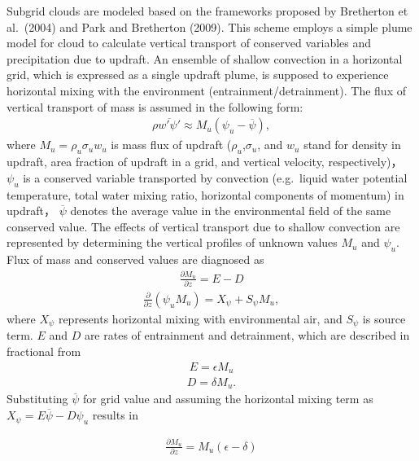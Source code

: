 Subgrid clouds are modeled based on the frameworks proposed by Bretherton et al.~(2004) and Park and Bretherton (2009). This scheme employs a simple plume model for cloud to calculate vertical
transport of conserved variables and precipitation due to updraft. An ensemble of shallow convection in a horizontal grid, which is expressed as a single updraft plume, is supposed to experience
horizontal mixing with the environment (entrainment/detrainment). The flux of vertical transport of mass is assumed in the following form: \begin{eqnarray} \label{def-Mu}
    \rho \overline {w' \psi '}\approx M_u (\psi_u-\overline{\psi}) ,\end{eqnarray} where \(M_u=\rho_u\sigma_u w_u\) is mass flux of updraft (\(\rho_u\),\(\sigma_u\), and \(w_u\) stand for density in updraft, area
fraction of updraft in a grid, and vertical velocity, respectively)， \(\psi_u\) is a conserved variable transported by convection (e.g.~liquid water potential temperature, total water mixing ratio,
horizontal components of momentum) in updraft， \(\overline{\psi}\) denotes the average value in the environmental field of the same conserved value. The effects of vertical transport due to shallow
convection are represented by determining the vertical profiles of unknown values \(M_u\) and \(\psi_u\). Flux of mass and conserved values are diagnosed as \begin{eqnarray}
    \frac{\partial M_u}{\partial z} = E - D \label{zprof-Mu}
\end{eqnarray} \begin{eqnarray}
    \frac{\partial}{\partial z} (\psi_u M_u) = X_\psi + S_\psi M_u,\label{zprof-psi} \end{eqnarray} where \(X_\psi\) represents horizontal mixing with environmental air, and \(S_\psi\) is source term. \(E\) and
\(D\) are rates of entrainment and detrainment, which are described in fractional from \begin{eqnarray}
    E =\epsilon M_u \label{fracE}
\end{eqnarray} \begin{eqnarray}
    D =\delta M_u. \label{fracD} \end{eqnarray} Substituting \(\overline{\psi}\) for grid value and assuming the horizontal mixing term as \(X_{\psi}=E \overline{\psi} - D\psi_u\) results in

\begin{eqnarray}
\frac{\partial M_u}{\partial z} = M_u (\epsilon - \delta) \label{zprof-Mu'}
\end{eqnarray}


